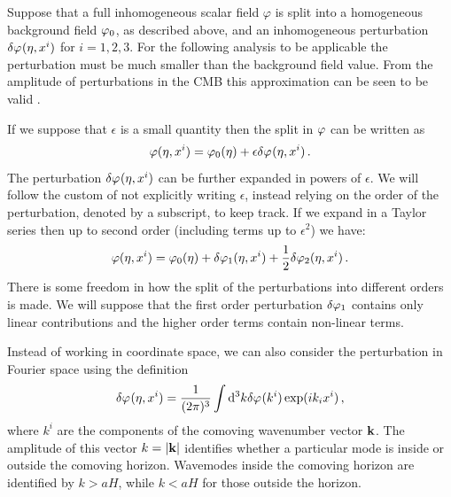 Suppose that a full inhomogeneous scalar field
$\varphi$ is split into a homogeneous background field $\varphi_0$, as described
above, and an inhomogeneous perturbation $\delta\varphi_{}(\eta,x^i)$ for $i=1,2,3$. For the
following
analysis to be applicable the perturbation must be much smaller than the background
field value. From the amplitude of perturbations in the CMB this approximation
can be seen to be valid \cite{Komatsu:2008hk}. 

If we suppose that $\epsilon$ is a small quantity then the split in $\varphi$
can be written as \cite{Malik:2008im}
% 
\begin{equation}
\label{eq:pertsplit-intro}
\varphi(\eta, x^i) = \varphi_0(\eta) + \epsilon\delta\varphi_{}(\eta, x^i) \,.
\end{equation}
% 
 The perturbation $\delta\varphi_{}(\eta, x^i)$ can be further expanded in
powers of $\epsilon$.  We will follow the
custom of not explicitly writing $\epsilon$, instead relying on the order of
the perturbation, denoted by a subscript, to keep track.
If we expand in a Taylor series then up to second order (\ie including terms
up to $\epsilon^2$) we have:
% 
\begin{equation}
 \varphi(\eta, x^i) = \varphi_0(\eta) + \delta\varphi_{1}(\eta, x^i) + \frac{1}{2}\delta\varphi_{2}(\eta, x^i)
\,.
\end{equation}
% 
There is some freedom in how the split of the perturbations into different
orders is made. We will suppose that the first order perturbation $\delta\varphi_{1}$
contains only linear contributions and the higher order terms contain non-linear
terms. 


Instead of working in coordinate space, we can also consider
the perturbation in Fourier space using the definition
% 
\begin{equation}
\label{eq:fourierdefn-intro}
 \delta\varphi_{}(\eta, x^i) = \frac{1}{(2 \pi)^3} \int \mathrm{d}^3k \delta\varphi_{}(k^i) \exp (i k_i
x^i)
\,,
\end{equation}
where $k^i$ are the components of the comoving wavenumber vector $\bf{k}$. The
amplitude of this
vector $k=|\bf{k}|$ identifies whether a particular mode is inside or outside
the comoving horizon. Wavemodes inside the comoving horizon are identified by
$k>aH$, while $k<aH$ for those outside the horizon. 


